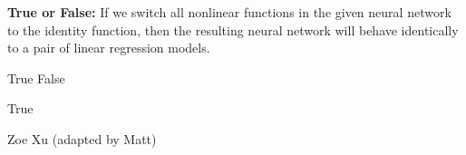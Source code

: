\begin{parts}
\begin{subparts}

\subpart[1] \textbf{True or False:} If we switch all nonlinear functions in the given neural network to the identity function, then the resulting neural network will behave identically to a pair of linear regression models.
    \begin{checkboxes}
     \choice True 
     \choice False
    \end{checkboxes}
    \begin{soln}
    True
    \end{soln}
    \begin{qauthor}
    Zoe Xu (adapted by Matt)
    \end{qauthor}

\end{subparts}


\end{parts}
